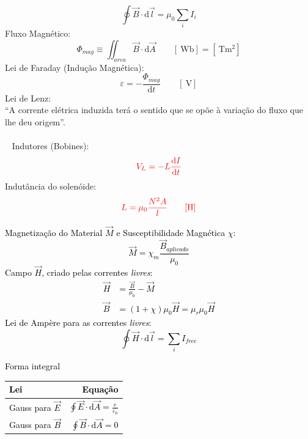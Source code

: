 \documentclass[a4paper,10pt]{extarticle} %
\newcommand{\mybox}[2]{
    \begin{tcolorbox}[colback=lightblue!5!white,colframe=lightblue!75!black,boxsep=1pt,arc=0pt,outer arc=0pt,title={\textcolor{black}{#1}}]
        \textcolor{black}{#2}
    \end{tcolorbox}
}
\begin{document}
\begin{multicols}{2}
{\begin{equation}
        \oint \vec{B} \cdot  \mathrm{d}\vec{l} = \mu_0 \sum_i I_i
    \end{equation}
     Fluxo Magnético:
    \begin{equation}
        \Phi_{mag} \equiv \iint_{area} \vec{B} \cdot \mathrm{d}\vec{A} \qquad  [\SI{}{\weber}]= [\SI{}{\tesla\meter\squared}]
    \end{equation}
    Lei de Faraday (Indução Magnética):
    \begin{equation}
        \varepsilon = -\frac{\Phi_{mag}}{\mathrm{d} t} \qquad [\SI{}{\volt}]
    \end{equation}
    Lei de Lenz:\\
    ``A corrente elétrica induzida terá o sentido que se opõe à variação do fluxo que lhe deu origem''.\\
    \\~
    Indutores (Bobines):
    \begin{equation}
        \color{red}
        V_L = - L\frac{\mathrm{d} I}{\mathrm{d} t}
    \end{equation}
     Indutância do solenóide:
    \begin{equation}
        \color{red}
        L = \mu_0 \frac{N^2 A}{l} \qquad [\SI{}{\henry}]
    \end{equation}
}
\mybox{Ferromagnetismo.}{
    Magnetização do Material $\vec{M}$ e Susceptibilidade Magnética $\chi$:
    \begin{equation}
        \vec{M} = \chi_m\frac{\vec{B}_{aplicado}}{\mu_0}
    \end{equation}
    Campo $\vec{H}$, criado pelas correntes \emph{livres}:
    \begin{align}
        \vec{H} &= \frac{\vec{B}}{\mu_0} - \vec{M}\\
        \vec{B} &= (1 + \chi) \mu_0 \vec{H} = \mu_r \mu_0 \vec{H}
    \end{align}
    Lei de Ampère para as correntes \emph{livres}:
    \begin{equation}
        \oint \vec{H} \cdot  \mathrm{d}\vec{l} = \sum_i I_{free}
    \end{equation}
}
%
\mybox{Equações (Leis) de Maxwell.}{
Forma integral
    \begin{tabular}{||l|r||}
        \hline  {\bf Lei} & {\bf Equação }\\
        \hline Gauss para \(\vec{E}\)  & \( \oint \vec{E}\cdot  \mathrm{d}\vec{A}  = \frac{e}{\varepsilon_0} \)\\
        \hline Gauss para \(\vec{B}\)  & \( \oint \vec{B}\cdot  \mathrm{d}\vec{A}  = 0 \)\\

\end{tabular}}
\end{multicols}
\end{document}
